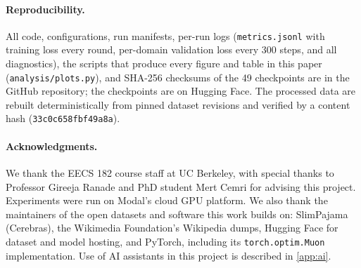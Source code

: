 \documentclass{article}
\begin{document}
\paragraph{Reproducibility.} All code, configurations, run manifests, per-run logs (\texttt{metrics.jsonl} with training loss every round, per-domain validation loss every 300 steps, and all diagnostics), the scripts that produce
every figure and table in this paper (\texttt{analysis/plots.py}), and SHA-256 checksums of the 49 checkpoints are in the GitHub repository; the checkpoints are on Hugging Face. The processed data are rebuilt deterministically from pinned dataset revisions and verified by a content hash (\texttt{33c0c658fbf49a8a}).

\paragraph{Acknowledgments.} We thank the EECS 182 course staff at UC Berkeley, with special thanks to Professor Gireeja Ranade and PhD student
Mert Cemri for advising this project. Experiments were run on Modal's cloud GPU platform. We also thank the maintainers of the open datasets and software this work builds on: SlimPajama (Cerebras), the Wikimedia Foundation's
Wikipedia dumps, Hugging Face for dataset and model hosting, and PyTorch, including its \texttt{torch.optim.Muon} implementation. Use of AI assistants in this project is described in \cref{app:ai}.




\clearpage
\appendix
\end{document}
